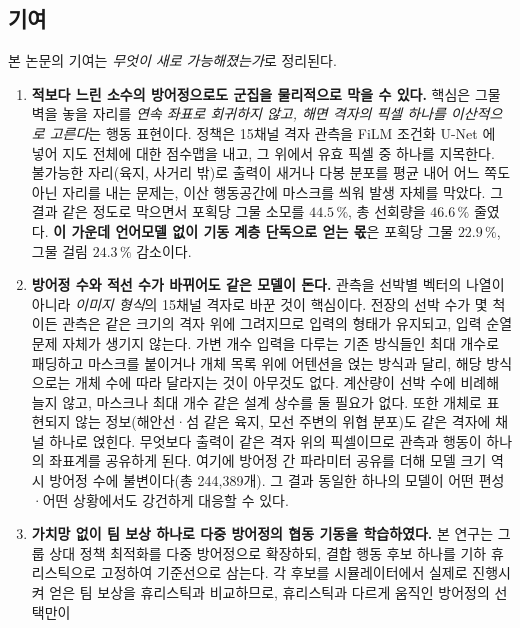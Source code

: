 \subsection{기여}

본 논문의 기여는 \emph{무엇이 새로 가능해졌는가}로 정리된다.

\begin{enumerate}[leftmargin=*, itemsep=3pt, topsep=4pt]
\item \textbf{적보다 느린 소수의 방어정으로도 군집을 물리적으로 막을 수 있다.} 핵심은
      그물벽을 놓을 자리를 \emph{연속 좌표로 회귀하지 않고, 해면 격자의 픽셀 하나를
      이산적으로 고른다}는 행동 표현이다. 정책은 15채널 격자 관측을 FiLM 조건화 U-Net 에
      넣어 지도 전체에 대한 점수맵을 내고, 그 위에서 유효 픽셀 중 하나를 지목한다.
      불가능한 자리(육지, 사거리 밖)로 출력이 새거나 다봉 분포를 평균 내어 어느 쪽도
      아닌 자리를 내는 문제는, 이산 행동공간에 마스크를 씌워 발생 자체를 막았다. 그 결과
      같은 정도로 막으면서 포획당 그물 소모를 $44.5\,\%$, 총 선회량을 $46.6\,\%$ 줄였다.
      \textbf{이 가운데 언어모델 없이 기동 계층 단독으로 얻는 몫}은 포획당 그물 $22.9\,\%$,
      그물 걸림 $24.3\,\%$ 감소이다.
\item \textbf{방어정 수와 적선 수가 바뀌어도 같은 모델이 돈다.} 관측을 선박별 벡터의
      나열이 아니라 \emph{이미지 형식}의 15채널 격자로 바꾼 것이 핵심이다. 전장의 선박
      수가 몇 척이든 관측은 같은 크기의 격자 위에 그려지므로 입력의 형태가 유지되고, 입력
      순열 문제 자체가 생기지 않는다. 가변 개수 입력을 다루는 기존 방식들인 최대 개수로
      패딩하고 마스크를 붙이거나 개체 목록 위에 어텐션을 얹는 방식과 달리, 해당 방식으로는
      개체 수에 따라 달라지는 것이 아무것도 없다. 계산량이 선박 수에 비례해 늘지 않고,
      마스크나 최대 개수 같은 설계 상수를 둘 필요가 없다. 또한 개체로 표현되지 않는
      정보(해안선·섬 같은 육지, 모선 주변의 위협 분포)도 같은 격자에 채널 하나로 얹힌다.
      무엇보다 출력이 같은 격자 위의 픽셀이므로 관측과 행동이 하나의 좌표계를 공유하게
      된다. 여기에 방어정 간 파라미터 공유를 더해 모델 크기 역시 방어정 수에 불변이다(총
      244{,}389개). 그 결과 동일한 하나의 모델이 어떤 편성·어떤 상황에서도 강건하게
      대응할 수 있다.
\item \textbf{가치망 없이 팀 보상 하나로 다중 방어정의 협동 기동을 학습하였다.} 본
      연구는 그룹 상대 정책 최적화를 다중 방어정으로 확장하되, 결합 행동 후보 하나를 기하
      휴리스틱으로 고정하여 기준선으로 삼는다. 각 후보를 시뮬레이터에서 실제로 진행시켜
      얻은 팀 보상을 휴리스틱과 비교하므로, 휴리스틱과 다르게 움직인 방어정의 선택만이

\end{enumerate}
